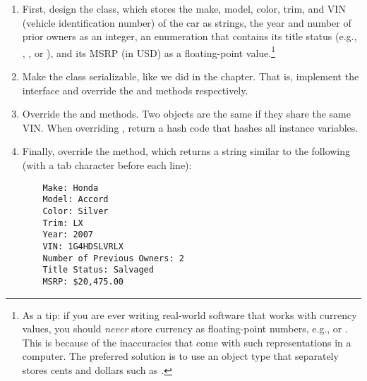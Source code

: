 \begin{enumerate}[label=(\alph*)]
    \item First, design the  class, which stores the make, model, color, trim, and VIN (vehicle identification number) of the car as strings, the year and number of prior owners as an integer, an enumeration that contains its title status (e.g., , , or ), and its MSRP (in USD) as a floating-point value.\footnote{As a tip: if you are ever writing real-world software that works with currency values, you should \emph{never} store currency as floating-point numbers, e.g.,  or . This is because of the inaccuracies that come with such representations in a computer. The preferred solution is to use an object type that separately stores cents and dollars such as .}

    \item Make the  class serializable, like we did in the chapter. That is, implement the  interface and override the  and  methods respectively. 

    \item Override the  and  methods. Two  objects are the same if they share the same VIN. When overriding , return a hash code that hashes all instance variables.
    
    \item Finally, override the  method, which returns a string similar to the following (with a tab character before each line):
\begin{small}
\begin{verbatim}
    Make: Honda
    Model: Accord
    Color: Silver
    Trim: LX
    Year: 2007
    VIN: 1G4HDSLVRLX
    Number of Previous Owners: 2
    Title Status: Salvaged
    MSRP: $20,475.00
\end{verbatim}
\end{small}


\end{enumerate}
